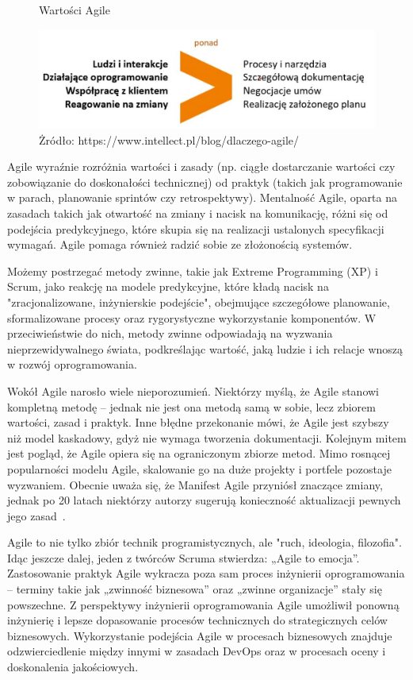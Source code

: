 \begin{figure}
    \centering
    \caption{Wartości Agile}
    \includegraphics[width=1\linewidth]{img/agile2.png}
    \caption*{Żródło: https://www.intellect.pl/blog/dlaczego-agile/}
\end{figure}

Agile wyraźnie rozróżnia wartości i zasady (np. ciągłe dostarczanie wartości czy zobowiązanie do doskonałości technicznej) od praktyk (takich jak programowanie w parach, planowanie sprintów czy retrospektywy). 
Mentalność Agile, oparta na zasadach takich jak otwartość na zmiany i nacisk na komunikację, różni się od podejścia predykcyjnego, które skupia się na realizacji ustalonych specyfikacji wymagań. Agile pomaga również radzić sobie ze złożonością systemów.\autocite{swebok}

Możemy postrzegać metody zwinne, takie jak Extreme Programming (XP) i Scrum, jako reakcję na modele predykcyjne, które kładą nacisk na "zracjonalizowane, inżynierskie podejście"\autocite{dyba2000}, obejmujące szczegółowe planowanie, sformalizowane procesy oraz rygorystyczne wykorzystanie komponentów.\autocite{boehm2002} W przeciwieństwie do nich, metody zwinne odpowiadają na wyzwania nieprzewidywalnego świata, podkreślając wartość, jaką ludzie i ich relacje wnoszą w rozwój oprogramowania.\autocite{dyba2009we}\autocite{nerur2007}

Wokół Agile narosło wiele nieporozumień. Niektórzy myślą, że Agile stanowi kompletną metodę – jednak nie jest ona metodą samą w sobie, lecz zbiorem wartości, zasad i praktyk. Inne błędne przekonanie mówi, że Agile jest szybszy niż model kaskadowy, gdyż nie wymaga tworzenia dokumentacji. Kolejnym mitem jest pogląd, że Agile opiera się na ograniczonym zbiorze metod. 
Mimo rosnącej popularności modelu Agile, skalowanie go na duże projekty i portfele pozostaje wyzwaniem. Obecnie uważa się, że Manifest Agile przyniósł znaczące zmiany, jednak po 20 latach niektórzy autorzy sugerują konieczność aktualizacji pewnych jego zasad~\cite{swebok}.

Agile to nie tylko zbiór technik programistycznych, ale "ruch, ideologia, filozofia". Idąc jeszcze dalej, jeden z twórców Scruma stwierdza: „Agile to emocja”.\autocite{meyer2014agile} Zastosowanie praktyk Agile wykracza poza sam proces inżynierii oprogramowania – terminy takie jak „zwinność biznesowa” oraz „zwinne organizacje” stały się powszechne. Z perspektywy inżynierii oprogramowania Agile umożliwił ponowną inżynierię i lepsze dopasowanie procesów technicznych do strategicznych celów biznesowych. Wykorzystanie podejścia Agile w procesach biznesowych znajduje odzwierciedlenie między innymi w zasadach DevOps oraz w procesach oceny i doskonalenia jakościowych.\autocite{swebok}

